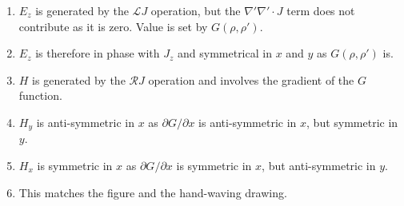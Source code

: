 \documentclass{article}
\newcommand{\0}{\varnothing}
\begin{document}
\begin{minipage}{0.45\textwidth}
\begin{enumerate}
    \item $E_z$ is generated by the $\mathcal{L}J$ operation, but the $\nabla'\nabla'\cdotp J$ term does not contribute as it is zero. Value is set by $G(\rho,\rho')$. 
    \item $E_z$ is therefore in phase with $J_z$ and symmetrical in $x$ and $y$ as $G(\rho,\rho')$ is.
    \item $H$ is generated by the $\mathcal{R}J$ operation and involves the gradient of the $G$ function. 
    \item $H_y$ is anti-symmetric in $x$ as $\partial G/\partial x$ is anti-symmetric in $x$, but symmetric in $y$.
    \item $H_x$ is symmetric in $x$ as $\partial G/\partial x$ is symmetric in $x$, but anti-symmetric in $y$.
    \item This matches the figure and the hand-waving drawing. 
\end{enumerate}
\end{minipage}

\newpage
 \ \\ 
\end{document}
